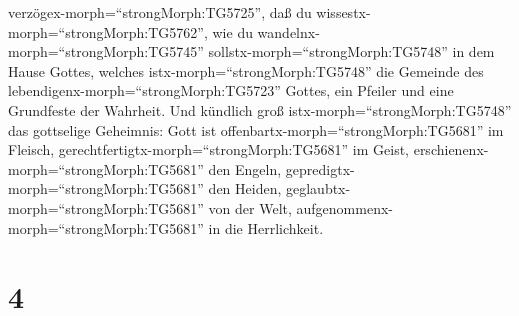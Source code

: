 verzögex-morph=``strongMorph:TG5725'', daß du
wissestx-morph=``strongMorph:TG5762'', wie du
wandelnx-morph=``strongMorph:TG5745''
sollstx-morph=``strongMorph:TG5748'' in dem Hause Gottes, welches
istx-morph=``strongMorph:TG5748'' die Gemeinde des
lebendigenx-morph=``strongMorph:TG5723'' Gottes, ein Pfeiler und eine
Grundfeste der Wahrheit.  Und kündlich groß
istx-morph=``strongMorph:TG5748'' das gottselige Geheimnis: Gott ist
offenbartx-morph=``strongMorph:TG5681'' im Fleisch,
gerechtfertigtx-morph=``strongMorph:TG5681'' im Geist,
erschienenx-morph=``strongMorph:TG5681'' den Engeln,
gepredigtx-morph=``strongMorph:TG5681'' den Heiden,
geglaubtx-morph=``strongMorph:TG5681'' von der Welt,
aufgenommenx-morph=``strongMorph:TG5681'' in die Herrlichkeit.

\hypertarget{section-3}{%
\section{4}\label{section-3}}

